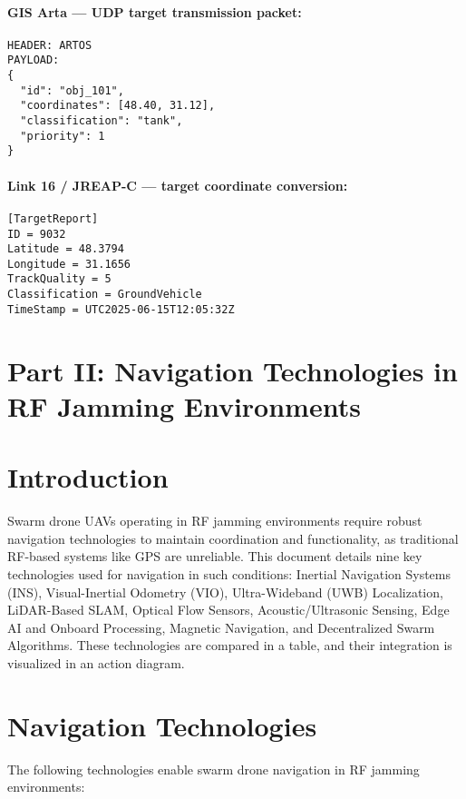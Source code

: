 \documentclass[12pt]{article}
\begin{document}
\paragraph{GIS Arta --- UDP target transmission packet:}
\begin{verbatim}
HEADER: ARTOS
PAYLOAD:
{
  "id": "obj_101",
  "coordinates": [48.40, 31.12],
  "classification": "tank",
  "priority": 1
}
\end{verbatim}

\paragraph{Link 16 / JREAP-C --- target coordinate conversion:}
\begin{verbatim}
[TargetReport]
ID = 9032
Latitude = 48.3794
Longitude = 31.1656
TrackQuality = 5
Classification = GroundVehicle
TimeStamp = UTC2025-06-15T12:05:32Z
\end{verbatim}

\newpage

\section*{Part II: Navigation Technologies in RF Jamming Environments}

\section{Introduction}
Swarm drone UAVs operating in RF jamming environments require robust navigation technologies to maintain coordination and functionality, as traditional RF-based systems like GPS are unreliable. This document details nine key technologies used for navigation in such conditions: Inertial Navigation Systems (INS), Visual-Inertial Odometry (VIO), Ultra-Wideband (UWB) Localization, LiDAR-Based SLAM, Optical Flow Sensors, Acoustic/Ultrasonic Sensing, Edge AI and Onboard Processing, Magnetic Navigation, and Decentralized Swarm Algorithms. These technologies are compared in a table, and their integration is visualized in an action diagram.

\section{Navigation Technologies}
The following technologies enable swarm drone navigation in RF jamming environments:
\end{document}
